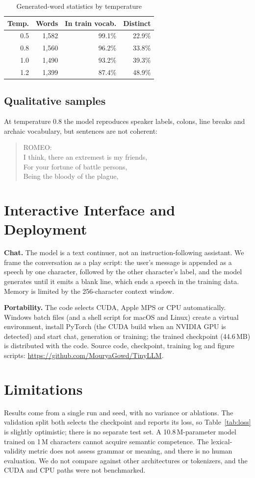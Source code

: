 \documentclass[conference]{IEEEtran}
\begin{document}
\begin{table}[t]
\caption{Generated-word statistics by temperature}\label{tab:temp}
\centering\small
\begin{tabular}{rrrr}
\toprule
Temp. & Words & In train vocab. & Distinct\\
\midrule
0.5 & 1,582 & 99.1\% & 22.9\%\\
0.8 & 1,560 & 96.2\% & 33.8\%\\
1.0 & 1,490 & 93.2\% & 39.3\%\\
1.2 & 1,399 & 87.4\% & 48.9\%\\
\bottomrule
\end{tabular}
\end{table}

\subsection{Qualitative samples}
At temperature 0.8 the model reproduces speaker labels, colons, line breaks and archaic vocabulary, but sentences are not coherent:
\begin{quote}\small\ttfamily
ROMEO:\\
I think, there an extremest is my friends,\\
For your fortune of battle persons,\\
Being the bloody of the plague,
\end{quote}

\section{Interactive Interface and Deployment}
\textbf{Chat.} The model is a text continuer, not an instruction-following assistant. We frame the conversation as a play script: the
user's message is appended as a speech by one character, followed by the other character's label, and the model generates until it
emits a blank line, which ends a speech in the training data. Memory is limited by the 256-character context window.

\textbf{Portability.} The code selects CUDA, Apple MPS or CPU automatically. Windows batch files (and a shell script for macOS and Linux)
create a virtual environment, install PyTorch (the CUDA build when an NVIDIA GPU is detected) and start chat, generation or training;
the trained checkpoint (44.6\,MB) is distributed with the code. Source code, checkpoint, training log and figure scripts:
\url{https://github.com/MouryaGowd/TinyLLM}.

\section{Limitations}
Results come from a single run and seed, with no variance or ablations. The validation split both selects the checkpoint and reports
its loss, so Table~\ref{tab:loss} is slightly optimistic; there is no separate test set. A 10.8\,M-parameter model trained on 1\,M
characters cannot acquire semantic competence. The lexical-validity metric does not assess grammar or meaning, and there is no human
evaluation. We do not compare against other architectures or tokenizers, and the CUDA and CPU paths were not benchmarked.
\end{document}
